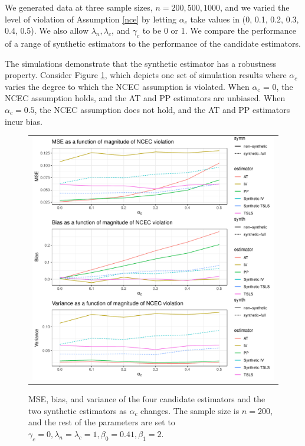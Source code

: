 \documentclass{article}
\begin{document}
We generated data at three sample sizes, $n = 200, 500, 1000$, and we varied the level of violation of Assumption \ref{nce} by letting $\alpha_c$ take values in (0, 0.1, 0.2, 0.3, 0.4, 0.5).  We also allow $\lambda_n, \lambda_c$, and $\gamma_c$ to be 0 or 1. We compare the performance of a range of synthetic estimators to the performance of the candidate estimators.

The simulations demonstrate that the synthetic estimator has a robustness property. Consider Figure \ref{mse_plot_1}, which depicts one set of simulation results where $\alpha_c$ varies the degree to which the NCEC assumption is violated. When $\alpha_c$ = 0, the NCEC assumption holds, and the AT and PP estimators are unbiased. When $\alpha_c = 0.5$, the NCEC assumption does not hold, and the AT and PP estimators incur bias. 
%
\begin{figure}
\centering
\begin{tabular}{c}
\includegraphics[width =\textwidth]{figures/synthetic-vs-others-plot.pdf}
\end{tabular}\vspace{0.2in}
\caption{MSE, bias, and variance of the four candidate estimators and the two synthetic estimators as $\alpha_c$ changes. The sample size is $n = 200$, and the rest of the parameters are set to $\gamma_c = 0, \lambda_n = \lambda_c = 1, \beta_0 = 0.41, \beta_1 = 2$.}\label{mse_plot_1}
\end{figure}
\end{document}
